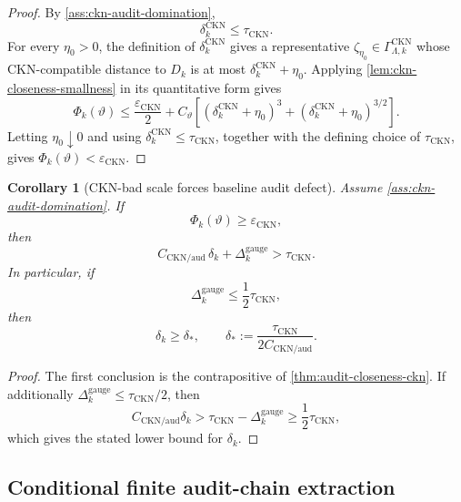 \documentclass[11pt]{article}
\numberwithin{equation}{section}
\theoremstyle{plain}
\newtheorem{corollary}[theorem]{Corollary}
\theoremstyle{definition}
\theoremstyle{remark}
\begin{document}
\begin{proof}
By \cref{ass:ckn-audit-domination},
\[
  \delta_k^{\mathrm{CKN}}\le\tau_{\mathrm{CKN}}.
\]
For every \(\eta_0>0\), the definition of
\(\delta_k^{\mathrm{CKN}}\) gives a representative
\(\zeta_{\eta_0}\in\Gamma_{\Lambda,k}^{\mathrm{CKN}}\) whose
CKN-compatible distance to \(D_k\) is at most
\(\delta_k^{\mathrm{CKN}}+\eta_0\).  Applying
\cref{lem:ckn-closeness-smallness} in its quantitative form gives
\[
  \Phi_k(\vartheta)
  \le
  \frac{\varepsilon_{\mathrm{CKN}}}{2}
  +
  C_\vartheta
  \left[
  (\delta_k^{\mathrm{CKN}}+\eta_0)^3
  +
  (\delta_k^{\mathrm{CKN}}+\eta_0)^{3/2}
  \right].
\]
Letting \(\eta_0\downarrow0\) and using
\(\delta_k^{\mathrm{CKN}}\le\tau_{\mathrm{CKN}}\), together with the defining
choice of \(\tau_{\mathrm{CKN}}\), gives
\(\Phi_k(\vartheta)<\varepsilon_{\mathrm{CKN}}\).
\end{proof}

\begin{corollary}[CKN-bad scale forces baseline audit defect]
\label{cor:ckn-bad-defect}
Assume \cref{ass:ckn-audit-domination}.  If
\[
  \Phi_k(\vartheta)\ge\varepsilon_{\mathrm{CKN}},
\]
then
\[
  C_{\mathrm{CKN/aud}}\,\delta_k+\Delta_k^{\mathrm{gauge}}
  >
  \tau_{\mathrm{CKN}}.
\]
In particular, if
\[
  \Delta_k^{\mathrm{gauge}}\le \frac12\tau_{\mathrm{CKN}},
\]
then
\[
  \delta_k\ge\delta_*,
  \qquad
  \delta_*:=
  \frac{\tau_{\mathrm{CKN}}}{2C_{\mathrm{CKN/aud}}}.
\]
\end{corollary}

\begin{proof}
The first conclusion is the contrapositive of
\cref{thm:audit-closeness-ckn}.  If additionally
\(\Delta_k^{\mathrm{gauge}}\le\tau_{\mathrm{CKN}}/2\), then
\[
  C_{\mathrm{CKN/aud}}\delta_k
  >
  \tau_{\mathrm{CKN}}-\Delta_k^{\mathrm{gauge}}
  \ge
  \frac12\tau_{\mathrm{CKN}},
\]
which gives the stated lower bound for \(\delta_k\).
\end{proof}

\subsection{Conditional finite audit-chain extraction}
\end{document}
